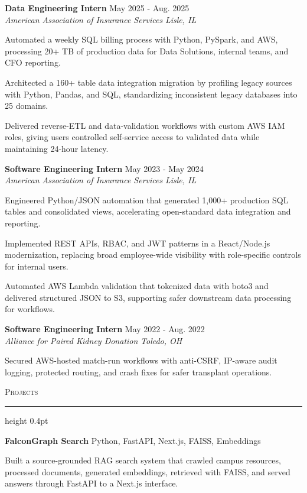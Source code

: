 \documentclass[letterpaper,11pt]{article}
\newcommand{\resumesection}[1]{%
  \par\vspace{2pt}%
  {\large\scshape #1}\par\vspace{2pt}%
  \hrule height 0.4pt\vspace{2pt}%
}
\newcommand{\resumeSubheading}[4]{
  \textbf{#1} \hfill #2\\
  \textit{#3} \hfill \textit{#4}
}
\newcommand{\projectHeading}[2]{
  \textbf{#1} \hfill #2
}
\begin{document}
\resumeSubheading
{Data Engineering Intern}{May 2025 - Aug. 2025}
{American Association of Insurance Services}{Lisle, IL}
\begin{tightitemize}
  \item Automated a weekly SQL billing process with Python, PySpark, and AWS, processing 20+ TB of production data for Data Solutions, internal teams, and CFO reporting.
  \item Architected a 160+ table data integration migration by profiling legacy sources with Python, Pandas, and SQL, standardizing inconsistent legacy databases into 25 domains.
  \item Delivered reverse-ETL and data-validation workflows with custom AWS IAM roles, giving users controlled self-service access to validated data while maintaining 24-hour latency.
\end{tightitemize}

\resumeSubheading
{Software Engineering Intern}{May 2023 - May 2024}
{American Association of Insurance Services}{Lisle, IL}
\begin{tightitemize}
  \item Engineered Python/JSON automation that generated 1,000+ production SQL tables and consolidated views, accelerating open-standard data integration and reporting.
  \item Implemented REST APIs, RBAC, and JWT patterns in a React/Node.js modernization, replacing broad employee-wide visibility with role-specific controls for internal users.
  \item Automated AWS Lambda validation that tokenized data with boto3 and delivered structured JSON to S3, supporting safer downstream data processing for workflows.
\end{tightitemize}

\resumeSubheading
{Software Engineering Intern}{May 2022 - Aug. 2022}
{Alliance for Paired Kidney Donation}{Toledo, OH}
\begin{tightitemize}
  \item Secured AWS-hosted match-run workflows with anti-CSRF, IP-aware audit logging, protected routing, and crash fixes for safer transplant operations.
\end{tightitemize}

\resumesection{Projects}
\projectHeading{FalconGraph Search}{Python, FastAPI, Next.js, FAISS, Embeddings}
\begin{tightitemize}
  \item Built a source-grounded RAG search system that crawled campus resources, processed documents, generated embeddings, retrieved with FAISS, and served answers through FastAPI to a Next.js interface.
\end{tightitemize}
\end{document}
